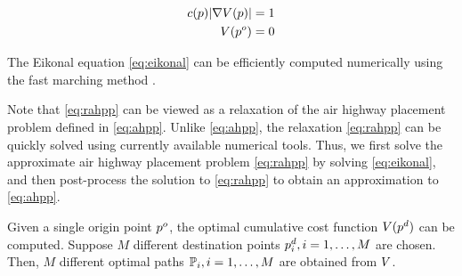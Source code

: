 \begin{equation}
\label{eq:eikonal}
\begin{aligned}
c(p)|\nabla V(p)| &= 1 \\
V(p^o) &= 0
\end{aligned}
\end{equation}

The Eikonal equation \eqref{eq:eikonal} can be efficiently computed numerically using the fast marching method \cite{Sethian96}.

Note that \eqref{eq:rahpp} can be viewed as a relaxation of the air highway placement problem defined in \eqref{eq:ahpp}. Unlike \eqref{eq:ahpp}, the relaxation \eqref{eq:rahpp} can be quickly solved using currently available numerical tools. Thus, we first solve the approximate air highway placement problem \eqref{eq:rahpp} by solving \eqref{eq:eikonal}, and then post-process the solution to \eqref{eq:rahpp} to obtain an approximation to \eqref{eq:ahpp}.

Given a single origin point $p^o$, the optimal cumulative cost function $V(p^d)$ can be computed. Suppose $M$ different destination points $p^d_i,i=1,\ldots,M$ are chosen. Then, $M$ different optimal paths $\mathbb{P}_i,i=1,\ldots,M$ are obtained from $V$.